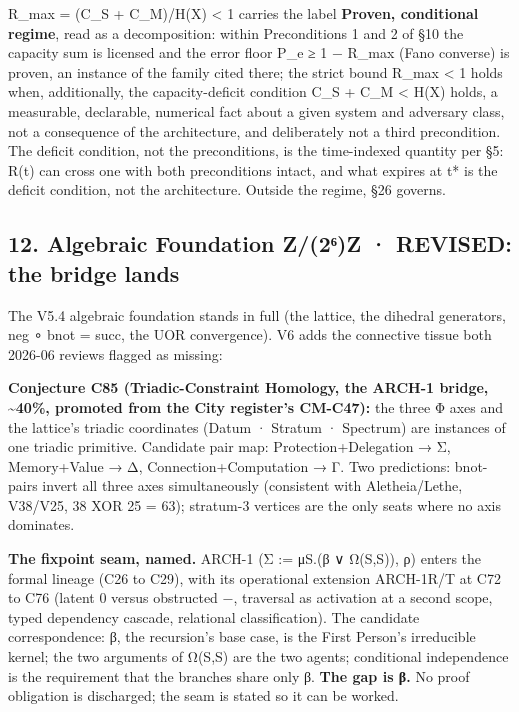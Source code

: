 \documentclass[
  11pt,
]{article}
\begin{document}
R\_max = (C\_S + C\_M)/H(X) \textless{} 1 carries the label
\textbf{Proven, conditional regime}, read as a decomposition: within
Preconditions 1 and 2 of §10 the capacity sum is licensed and the error
floor P\_e ≥ 1 − R\_max (Fano converse) is proven, an instance of the
family cited there; the strict bound R\_max \textless{} 1 holds when,
additionally, the capacity-deficit condition C\_S + C\_M \textless{}
H(X) holds, a measurable, declarable, numerical fact about a given
system and adversary class, not a consequence of the architecture, and
deliberately not a third precondition. The deficit condition, not the
preconditions, is the time-indexed quantity per §5: R(t) can cross one
with both preconditions intact, and what expires at t* is the deficit
condition, not the architecture. Outside the regime, §26 governs.

\subsection{12. Algebraic Foundation Z/(2⁶)Z · REVISED: the bridge
lands}\label{algebraic-foundation-z2ux2076z-revised-the-bridge-lands}

The V5.4 algebraic foundation stands in full (the lattice, the dihedral
generators, neg ∘ bnot = succ, the UOR convergence). V6 adds the
connective tissue both 2026-06 reviews flagged as missing:

\textbf{Conjecture C85 (Triadic-Constraint Homology, the ARCH-1 bridge,
\textasciitilde40\%, promoted from the City register's CM-C47):} the
three Φ axes and the lattice's triadic coordinates (Datum · Stratum ·
Spectrum) are instances of one triadic primitive. Candidate pair map:
Protection+Delegation → Σ, Memory+Value → Δ, Connection+Computation → Γ.
Two predictions: bnot-pairs invert all three axes simultaneously
(consistent with Aletheia/Lethe, V38/V25, 38 XOR 25 = 63); stratum-3
vertices are the only seats where no axis dominates.

\textbf{The fixpoint seam, named.} ARCH-1 (Σ := μS.(β ∨ Ω(S,S)), ρ)
enters the formal lineage (C26 to C29), with its operational extension
ARCH-1R/T at C72 to C76 (latent 0 versus obstructed −, traversal as
activation at a second scope, typed dependency cascade, relational
classification). The candidate correspondence: β, the recursion's base
case, is the First Person's irreducible kernel; the two arguments of
Ω(S,S) are the two agents; conditional independence is the requirement
that the branches share only β. \textbf{The gap is β.} No proof
obligation is discharged; the seam is stated so it can be worked.
\end{document}
